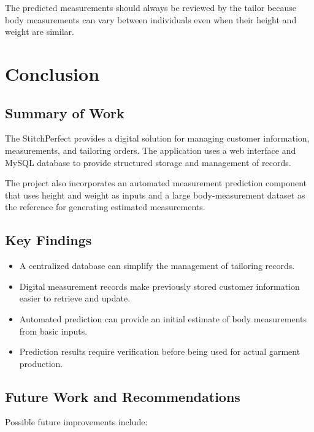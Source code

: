 \documentclass[12pt,a4paper]{report}
\begin{document}
The predicted measurements should always be reviewed by the tailor because
body measurements can vary between individuals even when their height and
weight are similar.


\chapter{Conclusion}

\section{Summary of Work}

The StitchPerfect provides a digital
solution for managing customer information, measurements, and tailoring
orders. The application uses a web interface and MySQL database to provide
structured storage and management of records.

The project also incorporates an automated measurement prediction component
that uses height and weight as inputs and a large body-measurement dataset as
the reference for generating estimated measurements.

\section{Key Findings}

\begin{itemize}
  \item A centralized database can simplify the management of tailoring
        records.
  \item Digital measurement records make previously stored customer
        information easier to retrieve and update.
  \item Automated prediction can provide an initial estimate of body
        measurements from basic inputs.
  \item Prediction results require verification before being used for actual
        garment production.
\end{itemize}

\section{Future Work and Recommendations}

Possible future improvements include:
\end{document}
